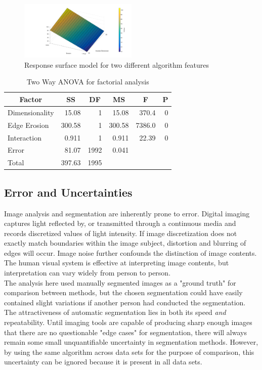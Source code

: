 \documentclass[11pt, twocolumn]{article}
\begin{document}
\begin{figure}[H]
	\centering
	\includegraphics[width=0.5\textwidth]{ResponseSurface.png}
	\caption{Response surface model for two different algorithm features}
	\label{fig:Surf}
\end{figure}



\begin{table}[htbp]
	\centering
	\caption{Two Way ANOVA for factorial analysis}
	\begin{tabular}{|lrrrrr|}
		\toprule
		\multicolumn{1}{|c}{Factor} & \multicolumn{1}{c}{SS} & \multicolumn{1}{c}{DF} & \multicolumn{1}{c}{MS} & \multicolumn{1}{c}{F} & \multicolumn{1}{c|}{P } \\
		\midrule
		Dimensionality & 15.08 & 1     & 15.08 & 370.4 & 0 \\
		Edge Erosion & 300.58 & 1     & 300.58 & 7386.0 & 0 \\
		Interaction & 0.911 & 1     & 0.911 & 22.39 & 0 \\
		Error & 81.07 & 1992  & 0.041 &       &  \\
		Total & 397.63 & 1995  &       &       &  \\
		\bottomrule
	\end{tabular}%
	\label{tab:TwoWay}%
\end{table}%


\subsection{Error and Uncertainties} 
Image analysis and segmentation are inherently prone to error. Digital imaging captures light reflected by, or transmitted through a continuous media and records discretized values of light intensity. If image discretization does not exactly match boundaries within the image subject, distortion and blurring of edges will occur. Image noise further confounds the distinction of image contents. The human visual system is effective at interpreting image contents, but interpretation can vary widely from person to person.\\
The analysis here used manually segmented images as a "ground truth" for comparison between methods, but the chosen segmentation could have easily contained slight variations if another person had conducted the segmentation. The attractiveness of automatic segmentation lies in both its speed \textit{and} repeatability. Until imaging tools are capable of producing sharp enough images that there are no questionable "edge cases" for segmentation, there will always remain some small unquantifiable uncertainty in segmentation methods. However, by using the same algorithm across data sets for the purpose of comparison, this uncertainty can be ignored because it is present in all data sets.
\end{document}
